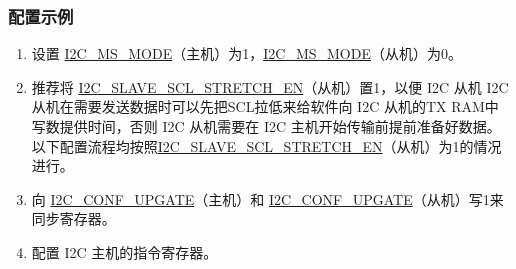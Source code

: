 \documentclass[main\_\_CN.tex]{subfiles}
\begin{document}
\subsubsection{配置示例}
\begin{enumerate}
\item 设置 \hyperref[fielddesc:I2CMSMODE]{I2C\_MS\_MODE}（主机）为1，\hyperref[fielddesc:I2CMSMODE]{I2C\_MS\_MODE}（从机）为0。
\item 推荐将 \hyperref[fielddesc:I2CSLAVESCLSTRETCHEN]{I2C\_SLAVE\_SCL\_STRETCH\_EN}（从机）置1，以便 I2C 从机 I2C 从机在需要发送数据时可以先把SCL拉低来给软件向 I2C 从机的TX RAM中写数提供时间，否则 I2C 从机需要在 I2C 主机开始传输前提前准备好数据。以下配置流程均按照\hyperref[fielddesc:I2CSLAVESCLSTRETCHEN]{I2C\_SLAVE\_SCL\_STRETCH\_EN}（从机）为1的情况进行。 
\item 向 \hyperref[fielddesc:I2CCONFUPGATE]{I2C\_CONF\_UPGATE}（主机）和 \hyperref[fielddesc:I2CCONFUPGATE]{I2C\_CONF\_UPGATE}（从机）写1来同步寄存器。
\item 配置 I2C 主机的指令寄存器。


\end{enumerate}
\end{document}
